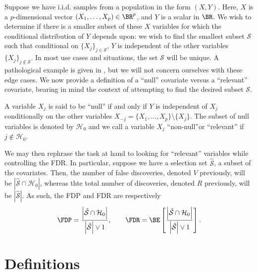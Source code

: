 \documentclass[11pt,reqno]{report}
\theoremstyle{definition}
\numberwithin{equation}{section}
\begin{document}
Suppose we have i.i.d. samples from a population in the form $(X, Y)$. Here, $X$ is a $p$-dimensional vector $(X_1, \ldots, X_p) \in \BR^p$, and $Y$ is a scalar in $\BR$. We wish to determine if there is a smaller subset of these $X$ variables for which the conditional distribution of $Y$ depends upon: we wish to find the smallest subset $\mathcal{S}$ such that conditional on $\{ X_j \}_{j \in \mathcal{S}}$, $Y$ is independent of the other variables $\{ X_j \}_{j \not \in \mathcal{S}}$. In most use cases and situations, the set $\mathcal{S}$ will be unique. A pathological example is given in \cite{panning}, but we will not concern ourselves with these edge cases. We now provide a definition of a ``null'' covariate versus a ``relevant'' covariate, bearing in mind the context of attempting to find the desired subset $\mathcal{S}$.
\begin{defn}
A variable $X_j$ is said to be ``null'' if and only if $Y$ is independent of $X_j$ conditionally on the other variables $X_{-j} = \{ X_1, \ldots, X_p \} \setminus \{ X_j\}$. The subset of null variables is denoted by $\mathcal{H}_0$ and we call a variable $X_j$ ``non-null''or ``relevant'' if $j \not \in \mathcal{H}_0$.
\end{defn}
We may then rephrase the task at hand to looking for ``relevant'' variables while controlling the FDR. In particular, suppose we have a selection set $\hat{\mathcal{S}}$, a subset of the covariates. Then, the number of false discoveries, denoted $V$ previously, will be $\left| \hat{\mathcal{S}} \cap \mathcal{H}_0 \right|$, whereas thte total number of discoveries, denoted $R$ previously, will be $\left| \hat{\mathcal{S}} \right|$. As such, the FDP and FDR are respectively
\begin{equation}
\FDP = \frac{\left| \hat{\mathcal{S}} \cap \mathcal{H}_0 \right|}{\left| \hat{\mathcal{S}} \right| \vee 1}, \qquad \FDR = \BE \left[ \frac{\left| \hat{\mathcal{S}} \cap \mathcal{H}_0 \right|}{\left| \hat{\mathcal{S}} \right| \vee 1} \right].
\end{equation}

\section{Definitions}
\end{document}
